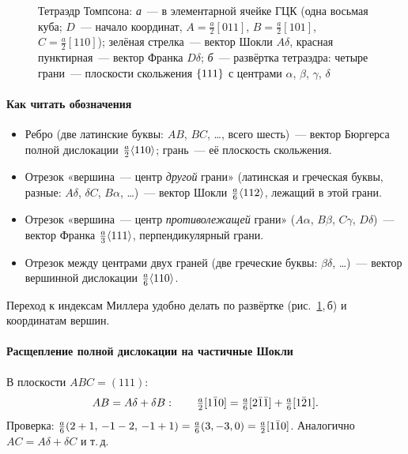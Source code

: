 \begin{figure}[ht]
\begin{subfigure}[b]{0.48\textwidth}
\caption{}
\end{subfigure}
\caption{Тетраэдр Томпсона: \textit{а}~— в элементарной ячейке ГЦК (одна
восьмая куба; $D$~— начало координат, $A=\frac a2[011]$, $B=\frac a2[101]$,
$C=\frac a2[110]$); зелёная стрелка~— вектор Шокли $A\delta$, красная
пунктирная~— вектор Франка $D\delta$; \textit{б}~— развёртка тетраэдра:
четыре грани~— плоскости скольжения $\{111\}$ с центрами $\alpha$,
$\beta$, $\gamma$, $\delta$}
\label{fig:thompson}
\end{figure}

\paragraph{Как читать обозначения}
\begin{itemize}
\item Ребро (две латинские буквы: $AB$, $BC$, \ldots, всего шесть)~—
вектор Бюргерса полной дислокации $\frac a2\langle 110\rangle$; грань~— её
плоскость скольжения.
\item Отрезок «вершина~— центр \emph{другой} грани» (латинская и греческая
буквы, разные: $A\delta$, $\delta C$, $B\alpha$, \ldots)~— вектор Шокли
$\frac a6\langle 112\rangle$, лежащий в этой грани.
\item Отрезок «вершина~— центр \emph{противолежащей} грани» ($A\alpha$,
$B\beta$, $C\gamma$, $D\delta$)~— вектор Франка $\frac a3\langle 111\rangle$,
перпендикулярный грани.
\item Отрезок между центрами двух граней (две греческие буквы:
$\beta\delta$, \ldots)~— вектор вершинной дислокации $\frac a6\langle 110\rangle$.
\end{itemize}
Переход к индексам Миллера удобно делать по развёртке
(рис.~\ref{fig:thompson},\,б) и координатам вершин.

\paragraph{Расщепление полной дислокации на частичные Шокли}
В плоскости $ABC=(111)$:
\begin{equation}\label{eq:thompson-split}
AB=A\delta+\delta B:\qquad \tfrac a2[1\bar{1}0]=\tfrac a6[2\bar{1}\bar{1}]+\tfrac a6[1\bar{2}1] .
\end{equation}
Проверка: $\frac a6(2+1,\,-1-2,\,-1+1)=\frac a6(3,-3,0)=\frac a2[1\bar{1}0]$.
Аналогично $AC=A\delta+\delta C$ и т.\,д.

